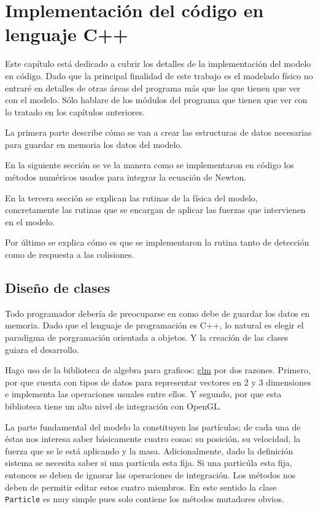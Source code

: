 \chapter{Implementación del código en lenguaje C++}
Este capítulo está dedicado a cubrir los detalles de la implementación del modelo en código.
Dado que la principal finalidad de este trabajo es el modelado físico no entraré en detalles de otras áreas del programa más que las que tienen que ver con el modelo.
Sólo hablare de los módulos del programa que tienen que ver con lo tratado en los capítulos anteriores.

La primera parte describe cómo se van a crear las estructuras de datos necesarias para guardar en memoria los datos del modelo.

En la siguiente sección se ve la manera como se implementaron en código los métodos numéricos usados para integrar la ecuación de Newton.

En la tercera sección se explican las rutinas de la física del modelo, concretamente las rutinas que se encargan de aplicar las fuerzas que intervienen en el modelo.

Por último se explica cómo es que se implementaron la rutina tanto de detección como de respuesta a las colisiones.

\section{Diseño de clases}
Todo programador debería de preocuparse en como debe de guardar los datos en memoria. Dado que el lenguaje de programación es C++, lo natural es elegir el paradigma de porgramación orientada a objetos. Y la creación de las clases guiara el desarrollo.

Hago uso de la biblioteca de algebra para graficos: \href{http://github.com/g-truc/glm}{glm} por dos razones.
Primero, por que cuenta con tipos de datos para representar vectores en 2 y 3 dimensiones e implementa las operaciones usuales entre ellos.
Y segundo, por que esta biblioteca tiene un alto nivel de integración con OpenGL.

La parte fundamental del modelo la constituyen las partículas; de cada una de éstas nos interesa saber básicamente cuatro cosas: su posición, su velocidad, la fuerza que se le está aplicando y la masa.
Adicionalmente, dado la definición sistema se necesita saber si una partícula esta fija.
Si una particúla esta fija, entonces se deben de ignorar las operaciones de integración.
Los métodos nos deben de permitir editar estos cuatro miembros. En este sentido la clase \texttt{Particle} es muy simple pues solo contiene los métodos mutadores obvios.

